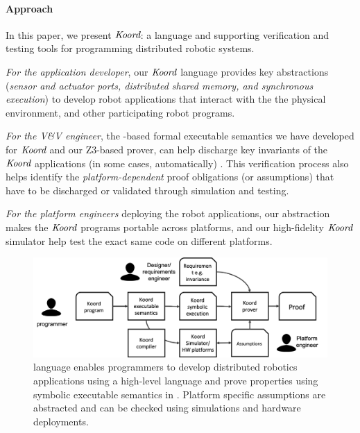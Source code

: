 \paragraph{Approach} In this paper, we present $\emph{Koord}$: a language and supporting verification and testing tools for programming distributed robotic systems. 
\begin{noinditem}
\item {\em For the application developer}, our $\emph{Koord}$ language provides key abstractions (\emph{sensor and actuator ports, distributed shared memory, and synchronous execution}) to develop robot applications that interact with the the physical environment, and other participating robot programs.
\item {\em For the V\&V engineer}, the \K-based formal executable semantics we have developed for $\emph{Koord}$ and our Z3-based prover, can help discharge key invariants of the $\emph{Koord}$ applications (in some cases, automatically) . This verification process also helps identify the {\em platform-dependent\/} proof obligations (or assumptions) that have to be discharged or validated through simulation and testing.
\item {\em For the platform engineers\/} deploying the robot applications, our abstraction makes the $\emph{Koord}$ programs portable across platforms, and our high-fidelity $\emph{Koord}$ simulator help test the exact same code on different platforms.
\end{noinditem}

\begin{figure}[h!]
\includegraphics[width=\linewidth]{figs/koorduser.png}
\caption{\small \lgname language  enables programmers to develop distributed robotics applications using a high-level language and prove properties using symbolic executable semantics in \K. Platform specific assumptions are abstracted and can be checked using simulations and hardware deployments.}
\label{fig:koorduser}
	\vspace{-5mm}
\end{figure}

